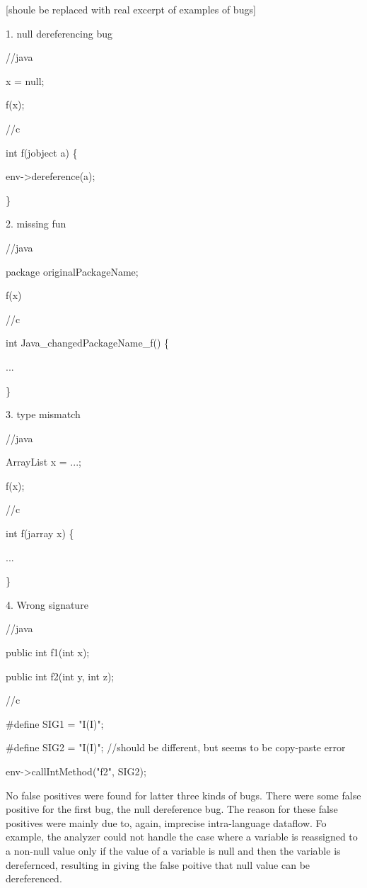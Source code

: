 [shoule be replaced with real excerpt of examples of bugs]

1. null dereferencing bug

//java

x = null;

f(x);

//c

int f(jobject a) \{

  env->dereference(a);

\}

2. missing fun

//java

package originalPackageName;

f(x)

//c

int Java\_changedPackageName\_f()  \{

  ...

\}

3. type mismatch

//java

ArrayList x = ...;

f(x);

//c

int f(jarray x) \{

  ...

\}

4. Wrong signature

//java

public int f1(int x);

public int f2(int y, int z);

//c

\#define SIG1 = "I(I)";

\#define SIG2 = "I(I)"; //should be different, but seems to be copy-paste error

env->callIntMethod("f2", SIG2);

No false positives were found for latter three kinds of bugs.  There were some
false positive for the first bug, the null dereference bug. The reason for
these false positives were mainly due to, again, imprecise intra-language
dataflow. Fo example, the analyzer could not handle the case where a variable
is reassigned to a non-null value only if the value of a variable is null and
then the variable is derefernced, resulting in giving the false poitive that
null value can be dereferenced.
